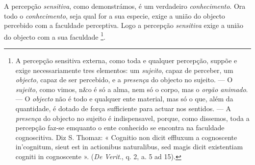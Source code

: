 
A percepção \emph{sensitiva}, como demonstrámos, é um verdadeiro \emph{conhecimento}. Ora todo o \emph{conhecimento}, seja qual for a sua especie, exige a união do objecto percebido com a faculdade perceptiva. Logo a percepção \emph{sensitiva} exige a união do objecto com a sua faculdade \footnote{A percepção sensitiva externa, como toda e qualquer percepção, suppõe e exige necessariamente tres elementos: um \emph{sujeito}, capaz de perceber, um \emph{objecto}, capaz de ser percebido, e a \emph{presença} do objecto no sujeito. --- O \emph{sujeito}, como vimos, n\&o é só a alma, nem só o corpo, mas o \emph{orgão animado}. --- O \emph{objecto} não é todo e qualquer ente material, mas só o que, além da quantidade, é dotado de força sufficiente para actuar nos sentidos. --- A \emph{presença} do objecto no sujeito é indispensavel, porque, como dissemos, toda a percepção faz-se emquanto o ente conhecido se encontra na faculdade cognoscitiva. Diz S. Thomaz: « Cognitio non dicit effluxum a cognoscente in'cognitum, sieut est in actionibus naturalibus, sed magis dicit existentiam cogniti in cognoscente ». (\emph{De Verit}., q. 2, a. 5 ad 15).}.


